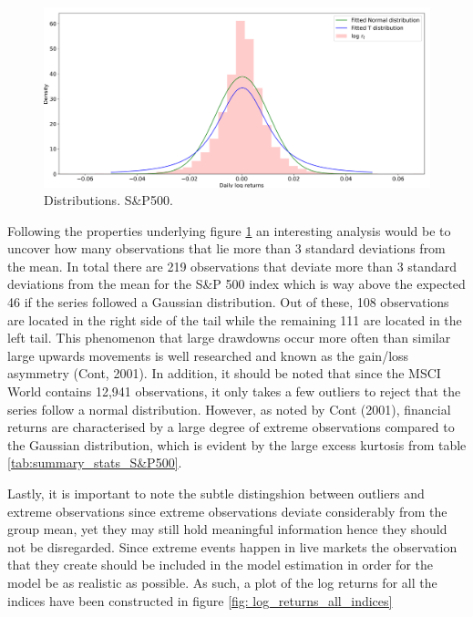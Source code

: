 \begin{figure}[H] 
    \centering
    \includegraphics[width=1\textwidth]{analysis/data_description/images/SP500_distribution.png}
    \caption{Distributions. S\&P500.}
    \label{fig: Kernel_distributions}
\end{figure}

Following the properties underlying figure \ref{fig: Kernel_distributions} an interesting analysis would be to uncover how many observations that lie more than 3 standard deviations from the mean. In total there are 219 observations that deviate more than 3 standard deviations from the mean for the S\&P 500 index which is way above the expected 46 if the series followed a Gaussian distribution. Out of these, 108 observations are located in the right side of the tail while the remaining 111 are located in the left tail. This phenomenon that large drawdowns occur more often than similar large upwards movements is well researched and known as the gain/loss asymmetry (Cont, 2001). In addition, it should be noted that since the MSCI World contains 12,941 observations, it only takes a few outliers to reject that the series follow a normal distribution. However, as noted by Cont (2001), financial returns are characterised by a large degree of extreme observations compared to the Gaussian distribution, which is evident by the large excess kurtosis from table \ref{tab:summary_stats_S&P500}.

Lastly, it is important to note the subtle distingshion between outliers and extreme observations since extreme observations deviate considerably from the group mean, yet they may still hold meaningful information hence they should not be disregarded.
Since extreme events happen in live markets the observation that they create should be included in the model estimation in order for the model be as realistic as possible. As such, a plot of the log returns for all the indices have been constructed in figure \ref{fig: log_returns_all_indices}

